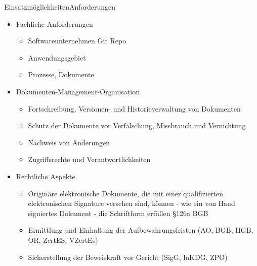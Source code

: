 \begin{frame}{Einsatzmöglichkeiten}{Anforderungen}
		\begin{itemize}
			\item{Fachliche Anforderungen}
			\note<1>
			{
				\begin{itemize}
					\item Softwareunternehmen Git Repo
				\end{itemize}}
			\begin{itemize}
				\item{Anwendungsgebiet}
				\item{Prozesse, Dokumente}
			\end{itemize}
			\pause
			\item{Dokumenten-Management-Organisation}
			\note<2>
			{
				\begin{itemize}
					\item {Fortschreibung, Versionen- und Historieverwaltung von Dokumenten}
					\item {Schutz der Dokumente vor Verfälschung, Missbrauch und Vernichtung}
				\end{itemize}
			}
			\begin{itemize}
				\item{Nachweis von Änderungen}
				\item{Zugriffsrechte und Verantwortlichkeiten}
			\end{itemize}
			\pause
			\item{Rechtliche Aspekte}
			\note<3>
			{
				\begin{itemize}
					\item Originäre elektronische Dokumente, die mit einer qualifizierten elektronischen Signature versehen sind, können - wie ein von Hand signiertes Dokument - die Schriftform erfüllen §126a BGB
				\end{itemize}
				}
			\begin{itemize}
				\item{Ermittlung und Einhaltung der Aufbewahrungsfristen (AO, BGB, HGB, OR, ZertES, VZertEs)}
				\item{Sicherstellung der Beweiskraft vor Gericht (SigG, luKDG, ZPO)}
			\end{itemize}
		\end{itemize}
\end{frame}
